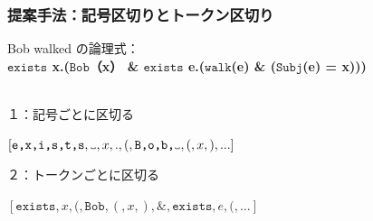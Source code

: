 \documentclass[dvipdfmx]{beamer}
\newcommand{\LF}[1]{\ensuremath{\texttt{#1}}}
\newcommand\vartextvisiblespace[1][.5em]{%
  \makebox[#1]{%
    \kern.07em
    \vrule height.3ex
    \hrulefill
    \vrule height.3ex
    \kern.07em
  }%
}
\begin{document}
\begin{frame}
\usetikzlibrary{shapes,snakes}%
\frametitle{提案手法：記号区切りとトークン区切り}
Bob walked の論理式：\\
\textbf{
  \LF{exists} x.(\LF{Bob}（x） \& \LF{exists} e.(\LF{walk}(e) \& (\LF{Subj}(e) = x)))
}
\\~\
\begin{block}{１：記号ごとに区切る}
\begin{center}
$[\LF{e,x,i,s,t,s}, {\tt \vartextvisiblespace}, x,.,(,\LF{B,o,b,}{\tt \vartextvisiblespace},(,x,),...]$
\end{center}
\end{block}
\begin{block}{２：トークンごとに区切る}
\begin{center}
  $[\LF{exists},x,(,\LF{Bob},(,x,),\&,\LF{exists},e,(,...]$
\end{center}
\end{block}
\end{frame}
\end{document}
